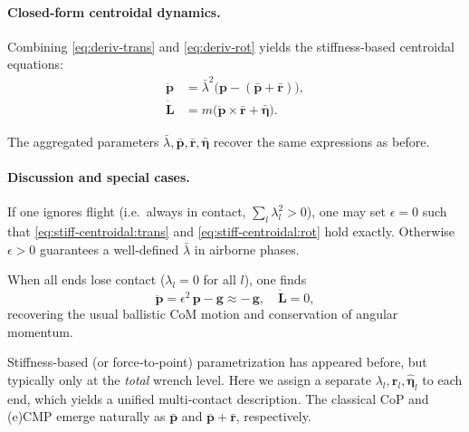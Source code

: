 \documentclass[main.tex]{subfiles}
\begin{document}
\begin{sloppypar}
\medskip
\paragraph{Closed‐form centroidal dynamics.}
Combining \eqref{eq:deriv‐trans} and \eqref{eq:deriv‐rot} yields the stiffness‐based centroidal equations:
\begin{subequations}\label{eq:stiff‐centroidal}
\begin{align}
\ddot{\mathbf{p}} &= \bar\lambda^2\bigl(\mathbf{p} - (\mathbf{\bar{p}} + \mathbf{\bar{r}})\bigr),
\label{eq:stiff‐centroidal:trans}\\
\dot{\mathbf{L}} &= m\bigl(\ddot{\mathbf{p}} \times \mathbf{\bar{r}} + \mathbf{\bar{\boldsymbol{\eta}}}\bigr).
\label{eq:stiff‐centroidal:rot}
\end{align}
\end{subequations}
 
\noindent
The aggregated parameters $\bar\lambda,\mathbf{\bar{p}},\mathbf{\bar{r}},\mathbf{\bar{\boldsymbol{\eta}}}$ recover the same expressions as before. 

\paragraph{Discussion and special cases.}
\begin{remark}
If one ignores flight (i.e.\ always in contact, $\sum_l\lambda_l^2>0$), one may set $\epsilon=0$ such that \eqref{eq:stiff‐centroidal:trans} and \eqref{eq:stiff‐centroidal:rot} hold exactly.  Otherwise $\epsilon>0$ guarantees a well‐defined $\bar\lambda$ in airborne phases.
\end{remark}

\begin{remark}
When all ends lose contact ($\lambda_l=0$ for all $l$), one finds
\[
\ddot{\mathbf{p}} = \epsilon^2\,\mathbf{p} - \mathbf{g} \approx -\,\mathbf{g},
\quad
\dot{\mathbf{L}} = 0,
\]
recovering the usual ballistic CoM motion and conservation of angular momentum.
\end{remark}

\begin{remark}
Stiffness‐based (or force‐to‐point) parametrization has appeared before, but typically only at the \emph{total} wrench level.  Here we assign a separate $\lambda_l,\mathbf{r}_l,\mathbf{\hat{\boldsymbol{\eta}}}_l$ to each end, which yields a unified multi‐contact description.  The classical CoP and (e)CMP emerge naturally as $\mathbf{\bar{p}}$ and $\mathbf{\bar{p}}+\mathbf{\bar{r}}$, respectively.
\end{remark}


\end{sloppypar}
\end{document}
